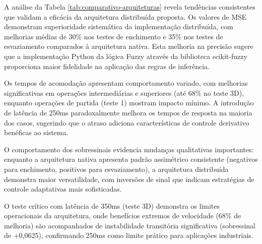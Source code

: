 A análise da Tabela \ref{tab:comparativo-arquiteturas} revela tendências consistentes que validam a eficácia da arquitetura distribuída proposta. Os valores de MSE demonstram superioridade sistemática da implementação distribuída, com melhorias médias de 30\% nos testes de enchimento e 35\% nos testes de esvaziamento comparados à arquitetura nativa. Esta melhoria na precisão sugere que a implementação Python da lógica Fuzzy através da biblioteca scikit-fuzzy proporciona maior fidelidade na aplicação das regras de inferência.

Os tempos de acomodação apresentam comportamento variado, com melhorias significativas em operações intermediárias e superiores (até 68\% no teste 3D), enquanto operações de partida (teste 1) mostram impacto mínimo. A introdução de latência de 250ms paradoxalmente melhora os tempos de resposta na maioria dos casos, sugerindo que o atraso adiciona características de controle derivativo benéficas ao sistema.

O comportamento dos sobressinais evidencia mudanças qualitativas importantes: enquanto a arquitetura nativa apresenta padrão assimétrico consistente (negativos para enchimento, positivos para esvaziamento), a arquitetura distribuída demonstra maior versatilidade, com inversões de sinal que indicam estratégias de controle adaptativas mais sofisticadas.

O teste crítico com latência de 350ms (teste 3D) demonstra os limites operacionais da arquitetura, onde benefícios extremos de velocidade (68\% de melhoria) são acompanhados de instabilidade transitória significativa (sobressinal de +0,0625), confirmando 250ms como limite prático para aplicações industriais.
